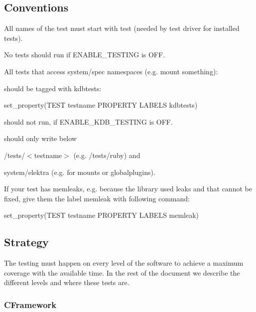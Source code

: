 \subsection*{Conventions}


\begin{DoxyItemize}
\item All names of the test must start with test (needed by test driver for installed tests).
\item No tests should run if E\+N\+A\+B\+L\+E\+\_\+\+T\+E\+S\+T\+I\+N\+G is O\+F\+F.
\item All tests that access system/spec namespaces (e.\+g. mount something)\+:
\begin{DoxyItemize}
\item should be tagged with kdbtests\+: \begin{DoxyVerb} set_property(TEST testname PROPERTY LABELS kdbtests)
\end{DoxyVerb}

\item should not run, if {\ttfamily E\+N\+A\+B\+L\+E\+\_\+\+K\+D\+B\+\_\+\+T\+E\+S\+T\+I\+N\+G} is O\+F\+F.
\item should only write below
\begin{DoxyItemize}
\item {\ttfamily /tests/$<$testname$>$} (e.\+g. {\ttfamily /tests/ruby}) and
\item {\ttfamily system/elektra} (e.\+g. for mounts or globalplugins).
\end{DoxyItemize}
\end{DoxyItemize}
\item If your test has memleaks, e.\+g. because the library used leaks and that cannot be fixed, give them the label memleak with following command\+:

set\+\_\+property(\+T\+E\+S\+T testname P\+R\+O\+P\+E\+R\+T\+Y L\+A\+B\+E\+L\+S memleak)
\end{DoxyItemize}

\subsection*{Strategy}

The testing must happen on every level of the software to achieve a maximum coverage with the available time. In the rest of the document we describe the different levels and where these tests are.

\subsubsection*{C\+Framework}

